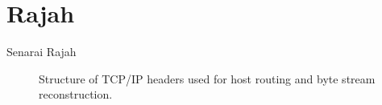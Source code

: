 \chapter{Rajah}

Senarai Rajah

\begin{figure}
    \caption[Structure of TCP/IP headers]{Structure of TCP/IP headers used for host
    routing and byte stream reconstruction.}
    \label{c2:f2}
\end{figure}

